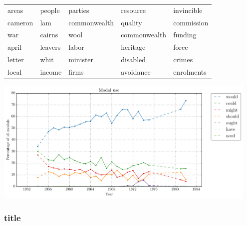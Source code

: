 \documentclass{beamer}       %
\begin{document}
\begin{frame}
\begin{table}[h!]
\begin{tabular}{lllll}
areas        & people     & \cellcolor{gray!25}parties      & resource     & invincible  \\
cameron      & \cellcolor{gray!25}lam        & commonwealth & quality      & commission  \\
\cellcolor{green!25}war          & cairns     & \cellcolor{red!25}wool         & commonwealth & \cellcolor{orange!25}funding     \\
april        & leavers    & \cellcolor{gray!25}labor        & heritage     & \cellcolor{green!25}force       \\
letter       & \cellcolor{gray!25}whit       & \cellcolor{gray!25}minister     & \cellcolor{yellow!25}disabled     & crimes      \\
\cellcolor{red!25}local        & \cellcolor{orange!25}income     & firms        & avoidance    & enrolments  \\
\bottomrule
\end{tabular}
\end{table}
\end{frame}


\begin{frame}
    \centering
    \includegraphics[width=0.95\textwidth]{images/modal-use.png}
\end{frame}


\begin{frame}
    \frametitle{title}
    \centering
\end{frame}
\end{document}
